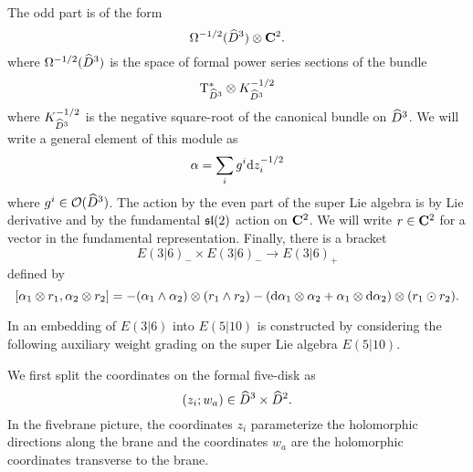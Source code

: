 \documentclass[11pt]{amsart}
\begin{document}
The odd part is of the form
\[
\Omega^{-1/2}(\Hat{D}^3) \otimes \C^2 .
\]
where $\Omega^{-1/2}(\Hat{D}^3)$ is the space of formal power series sections of the bundle
\[
\T_{\Hat{D}^3}^{*} \otimes K_{\Hat{D}^3}^{-1/2}
\]
where $K_{\Hat{D}^3}^{-1/2}$ is the negative square-root of the canonical bundle on $\Hat{D}^3$. 
We will write a general element of this module as 
\[
\alpha = \sum_i g^i \d z_i^{-1/2} 
\]
where $g^i \in \cO(\Hat{D}^3)$. 
The action by the even part of the super Lie algebra is by Lie derivative and by the fundamental $\lie{sl}(2)$ action on $\C^2$.
We will write $r \in \C^2$ for a vector in the fundamental representation.
Finally, there is a bracket 
\[
E(3|6)_- \times E(3|6)_- \to E(3|6)_+
\]
defined by
\[
[\alpha_1 \otimes r_1, \alpha_2 \otimes r_2] = - (\alpha_1 \wedge \alpha_2) \otimes (r_1 \wedge r_2) - (\d \alpha_1 \otimes \alpha_2 + \alpha_1 \otimes \d \alpha_2) \otimes (r_1 \odot r_2) .
\]


\parsec[s:weight]

In \cite{KacRudakov} an embedding of $E(3|6)$ into $E(5|10)$ is constructed by considering the following auxiliary weight grading on the super Lie algebra $E(5|10)$. 

We first split the coordinates on the formal five-disk as
\[
(z_i ; w_a) \in \Hat{D}^3 \times \Hat{D}^2 .
\]
In the fivebrane picture, the coordinates $z_i$ parameterize the holomorphic directions along the brane and the coordinates $w_a$ are the holomorphic coordinates transverse to the brane.
\end{document}
